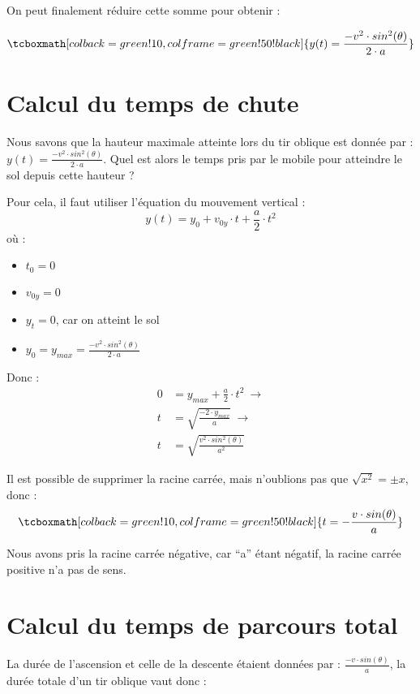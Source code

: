 On peut finalement réduire cette somme pour obtenir :


\begin{equation}
    \tcboxmath[colback=green!10,colframe=green!50!black]{y(t)=\frac{-v^2 \cdot sin^2(\theta)}{2 \cdot a}}
\end{equation}

\section{Calcul du temps de chute}
Nous savons que la hauteur maximale atteinte lors du tir oblique est donnée par : \(y(t)=\frac{-v^2 \cdot sin^2(\theta)}{2 \cdot a}\). Quel est alors le temps pris par le mobile pour atteindre le sol depuis cette hauteur ?

Pour cela, il faut utiliser l'équation du mouvement vertical :
\begin{equation}
    y(t)=y_0 + v_{0y} \cdot t + \frac{a}{2} \cdot t^2
\end{equation} où :

\begin{itemize}[label=\textbullet]
    \item \(t_0=0\)
    \item \(v_{0y}=0\)
    \item \(y_t=0\), car on atteint le sol
    \item \(y_0=y_{max}=\frac{-v^2 \cdot sin^2(\theta)}{2 \cdot a}\)
\end{itemize}

Donc :
\begin{align}
    0 & =y_{max}+\frac{a}{2} \cdot t^2 \ \rightarrow     \\
    t & =\sqrt{\frac{-2 \cdot y_{max}}{a}} \ \rightarrow \\
    t & =\sqrt{\frac{v^2 \cdot sin^2 (\theta)}{a^2}}
\end{align}

Il est possible de supprimer la racine carrée, mais n'oublions pas que \(\sqrt{x^2}=\pm x\), donc :
\begin{equation}
    \tcboxmath[colback=green!10,colframe=green!50!black]{t=-\frac{v \cdot sin(\theta)}{a}}
\end{equation}

Nous avons pris la racine carrée négative, car \enquote{a} étant négatif, la racine carrée positive n'a pas de sens.

\section{Calcul du temps de parcours total}
La durée de l'ascension et celle de la descente étaient données par : \(\frac{-v \cdot sin(\theta)}{a}\), la durée totale d'un tir oblique vaut donc :

